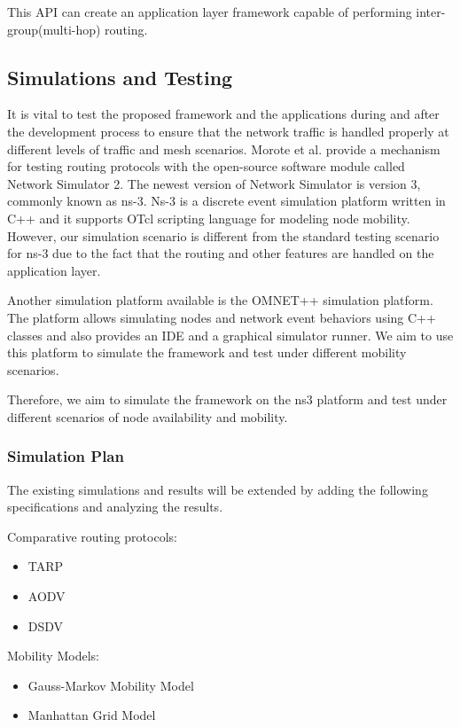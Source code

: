 \vspace{0.1cm}

This API can create an application layer framework capable of performing
inter-group(multi-hop) routing.

\subsection{Simulations and Testing}

It is vital to test the proposed framework and the applications during and
after the development process to ensure that the network traffic is handled
properly at different levels of traffic and mesh scenarios. Morote et al.
provide a mechanism for testing routing protocols with the open-source software
module called Network Simulator 2\cite{morote2010}. The newest version of
Network Simulator is version 3, commonly known as ns-3\cite{ns3}. Ns-3 is a
discrete event simulation platform written in C++ and it supports OTcl scripting
language for modeling node mobility\cite{morote2010}. However, our simulation
scenario is different from the standard testing scenario for ns-3 due to the
fact that the routing and other features are handled on the application layer.

Another simulation platform available is the OMNET++ simulation platform. The
platform allows simulating nodes and network event behaviors using C++ classes
and also provides an IDE and a graphical simulator runner\cite{opensim}. We aim to
use this platform to simulate the framework and test under different mobility
scenarios.

Therefore, we aim to simulate the framework on the ns3 platform and test under
different scenarios of node availability and mobility.

\vspace{0.3cm}

\subsubsection{Simulation Plan}
The existing simulations and results will be extended by adding the following
specifications and analyzing the results.

\vspace{0.3cm}

Comparative routing protocols:
\begin{itemize}
    \item TARP
    \item AODV
    \item DSDV
\end{itemize}

\vspace{0.3cm}

Mobility Models:
\begin{itemize}
    \item Gauss-Markov Mobility Model
    \item Manhattan Grid Model
\end{itemize}



